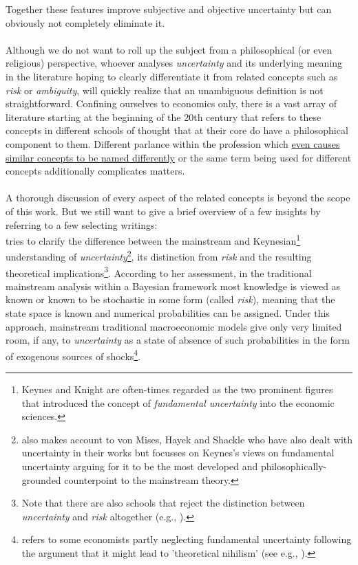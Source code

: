 \documentclass[a4paper,12pt,oneside,pointednumbers,bibtotoc,bigheadings,liststotoc]{scrbook}
\newcommand{\forceindent}{\leavevmode{\parindent=1em\indent}}
\begin{document}
Together these features improve subjective and objective uncertainty but can obviously not completely eliminate it. \\
\\
Although we do not want to roll up the subject from a philosophical (or even religious) perspective, whoever analyses \textit{uncertainty} and its underlying meaning in the literature hoping to clearly differentiate it from related concepts such as \textit{risk} or \textit{ambiguity}, will quickly realize that an unambiguous definition is not straightforward. Confining ourselves to economics only, there is a vast array of literature starting at the beginning of the 20th century that refers to these concepts in different schools of thought that at their core do have a philosophical component to them. Different parlance within the profession which \href{http://www.economics-ejournal.org/economics/discussionpapers/2015-36/file}{even causes similar concepts to be named differently} or the same term being used for different concepts additionally complicates matters.\\
\\
A thorough discussion of every aspect of the related concepts is beyond the scope of this work. But we still want to give a brief overview of a few insights by referring to a few selecting writings:\\
\forceindent \citet{dow:16} tries to clarify the difference between the mainstream and Keynesian\footnote{Keynes and Knight are often-times regarded as the two prominent figures that introduced the concept of \textit{fundamental uncertainty} into the economic sciences.} understanding of \textit{uncertainty}\footnote{\citet{dow:16} also makes account to von Mises, Hayek and Shackle who have also dealt with uncertainty in their works but focusses on Keynes's views on fundamental uncertainty arguing for it to be the most developed and philosophically-grounded counterpoint to the mainstream theory.}, its distinction from \textit{risk} and the resulting theoretical implications\footnote{Note that there are also schools that reject the distinction between \textit{uncertainty} and \textit{risk} altogether (e.g., \citealp{savage:54}).}. According to her assessment, in the traditional mainstream analysis within a Bayesian framework most knowledge is viewed as known or known to be stochastic in some form (called \textit{risk}), meaning that the state space is known and numerical probabilities can be assigned. Under this approach, mainstream traditional macroeconomic models give only very limited room, if any, to \textit{uncertainty} as a state of absence of such probabilities in the form of exogenous sources of shocks\footnote{\citet[p. 43]{dequesh:00} refers to some economists partly neglecting fundamental uncertainty following the argument that it might lead to 'theoretical nihilism' (see e.g., \citealp{coddington:82}).}. \\
\end{document}
